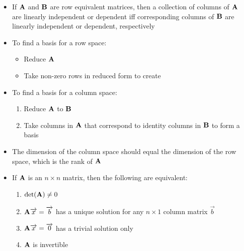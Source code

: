 \documentclass[12pt]{article}
\begin{document}
\begin{itemize}
  \item If $\bold{A}$ and $\bold{B}$ are row equivalent matrices, then a collection of columns of $\bold{A}$ are linearly independent or dependent iff corresponding columns of $\bold{B}$ are linearly independent or dependent, respectively

  \item To find a basis for a row space:

    \begin{itemize}

      \item Reduce $\bold{A}$

      \item Take non-zero rows in reduced form to create 

    \end{itemize}

  \item To find a basis for a column space:

    \begin{enumerate}

      \item Reduce $\bold{A}$ to $\bold{B}$

      \item Take columns in $\bold{A}$ that correspond to identity columns in $\bold{B}$ to form a basis

    \end{enumerate}

  \item The dimension of the column space should equal the dimension of the row space, which is the rank of $\bold{A}$

  \item If $\bold{A}$ is an $n \times n$ matrix, then the following are equivalent:

    \begin{enumerate}

      \item $\det(\bold{A})\neq0$

      \item $\bold{A}\overrightarrow{x}=\overrightarrow{b}$ has a unique solution for any $n\times1$ column matrix $\overrightarrow{b}$

      \item $\bold{A}\overrightarrow{x}=\overrightarrow{0}$ has a trivial solution only

      \item $\bold{A}$ is invertible


\end{enumerate}
\end{itemize}
\end{document}
